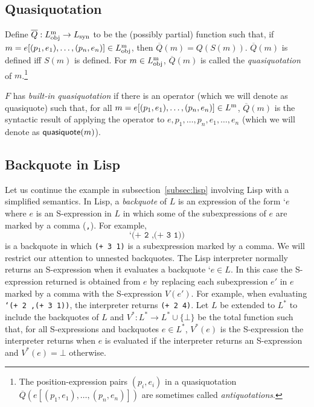 \documentclass[11pt,fleqn]{article}
\newcommand{\set}[1]{{\{ #1 \}}}
\newcommand{\mlist}[1]{{[ #1 ]}}
\newcommand{\mname}[1]{\mbox{\sf #1}}
\newcommand{\tarrow}{\rightarrow}
\begin{document}
\subsection{Quasiquotation}

Define $\overline{Q} : L^{\rm m}_{\rm obj} \tarrow L_{\rm syn}$ to be
the (possibly partial) function such that, if $m =
e\mlist{(p_1,e_1),\ldots,(p_n,e_n)} \in L^{\rm m}_{\rm obj}$, then
$\overline{Q}(m) = Q(S(m))$.  $\overline{Q}(m)$ is defined iff $S(m)$
is defined.  For $m \in L^{\rm m}_{\rm obj}$, $\overline{Q}(m)$ is
called the \emph{quasiquotation} of $m$.\footnote{The
  position-expression pairs $(p_i,e_i)$ in a quasiquotation
  $\overline{Q}(e\mlist{(p_1,e_1),\ldots,(p_n,e_n)})$ are sometimes
  called \emph{antiquotations}.}

$F$ has \emph{built-in quasiquotation} if there is an operator (which
we will denote as \mname{quasiquote}) such that, for all $m =
e\mlist{(p_1,e_1),\ldots,(p_n,e_n)} \in L^{\rm m}$, $\overline{Q}(m)$
is the syntactic result of applying the operator to
$e,p_1,\ldots,p_n,e_1,\ldots,e_n$ (which we will denote as
$\mname{quasiquote}(m)$).

\subsection{Backquote in Lisp} \label{subsec:backquote} 

Let us continue the example in subsection~\ref{subsec:lisp} involving
Lisp with a simplified semantics.  In Lisp, a \emph{backquote} of $L$
is an expression of the form $\texttt{`}e$ where $e$ is an
S-expression in $L$ in which some of the subexpressions of $e$ are
marked by a comma (\texttt{,}).  For example,
\[\texttt{`(+ 2 ,(+ 3 1))}\] is a backquote in which \texttt{(+ 3 1)} 
is a subexpression marked by a comma.  We will restrict our attention
to unnested backquotes.  The Lisp interpreter normally returns an
S-expression when it evaluates a backquote $\texttt{`}e \in L$.  In
this case the S-expression returned is obtained from $e$ by replacing
each subexpression $e'$ in $e$ marked by a comma with the S-expression
$V(e')$.  For example, when evaluating \texttt{`(+ 2 ,(+ 3 1))}, the
interpreter returns \mbox{\texttt{(+ 2 4)}}.  Let $L$ be extended to
$L^\ast$ to include the backquotes of $L$ and $V^\ast : L^\ast \tarrow
L^\ast \cup \set{\bot}$ be the total function such that, for all
S-expressions and backquotes $e \in L^\ast$, $V^\ast(e)$ is the
S-expression the interpreter returns when $e$ is evaluated if the
interpreter returns an S-expression and $V^\ast(e) = \bot$ otherwise.
\end{document}
